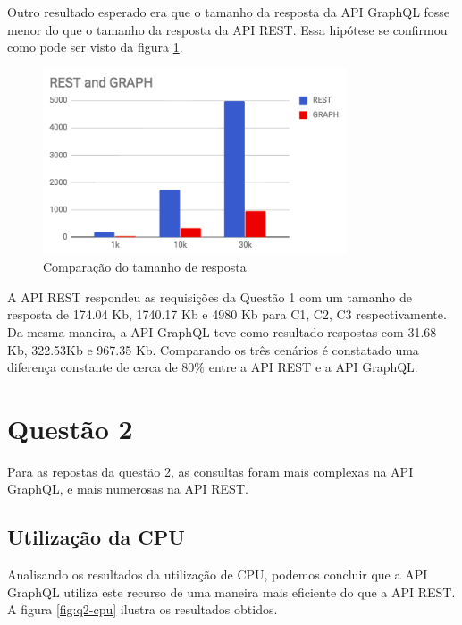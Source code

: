 Outro resultado esperado era que o tamanho da resposta da API GraphQL fosse menor do que o tamanho da resposta da API REST. Essa hipótese se confirmou como pode ser visto da figura \ref{fig:q1-size}.

\begin{figure}[htbp]
    \centering
    \includegraphics[width=0.8\textwidth]{figuras/Q1-size.png}
    \caption{Comparação do tamanho de resposta}
    \label{fig:q1-size}
    \author{fonte: Autor}
\end{figure}

A API REST respondeu as requisições da Questão 1 com um tamanho de resposta de 174.04 Kb, 1740.17 Kb e 4980 Kb para C1, C2, C3 respectivamente. Da mesma maneira, a API GraphQL teve como resultado respostas com 31.68 Kb, 322.53Kb e 967.35 Kb. Comparando os três cenários é constatado uma diferença constante de cerca de 80\% entre a API REST e a API GraphQL.


\section{Questão 2}

Para as repostas da questão 2, as consultas foram mais complexas na API GraphQL, e mais numerosas na API REST. 

\subsection{Utilização da CPU}

Analisando os resultados da utilização de CPU, podemos concluir que a API GraphQL utiliza este recurso de uma maneira mais eficiente do que a API REST. A figura \ref{fig:q2-cpu} ilustra os resultados obtidos.

